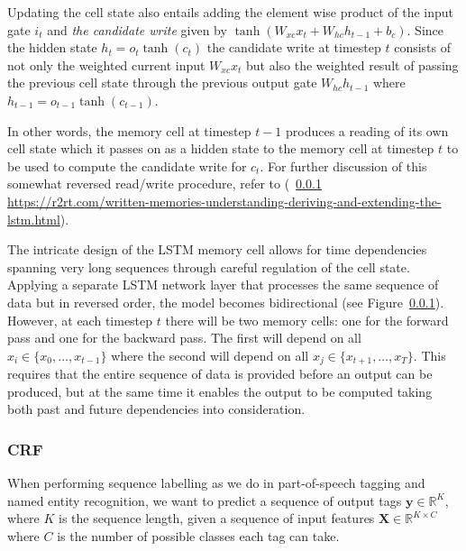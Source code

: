Updating the cell state also entails adding the element wise product of the
input gate $i_{t}$ and \textit{the candidate write} given by $\tanh(W_{xc}x_{t}
+ W_{hc}h_{t-1} + b_{c})$. Since the hidden state $h_{t} = o_{t}\tanh(c_{t})$
the candidate write at timestep $t$ consists of not only the weighted current
input $W_{xc}x_{t}$ but also the weighted result of passing the previous cell
state through the previous output gate $W_{hc}h_{t-1}$ where $h_{t-1} =
o_{t-1}\tanh(c_{t-1})$.

In other words, the memory cell at timestep $t-1$ produces a reading of its own
cell state which it passes on as a hidden state to the memory cell at timestep
$t$ to be used to compute the candidate write for $c_{t}$. For further
discussion of this somewhat reversed read/write procedure, refer to (~\ref{}
\url{https://r2rt.com/written-memories-understanding-deriving-and-extending-the-lstm.html}).

The intricate design of the LSTM memory cell allows for time dependencies
spanning very long sequences through careful regulation of the cell state.
Applying a separate LSTM network layer that processes the same sequence of data
but in reversed order, the model becomes bidirectional (see Figure~\ref{}).
However, at each timestep $t$ there will be two memory cells: one for the
forward pass and one for the backward pass. The first will depend on all $x_{i}
\in \{x_{0}, \ldots, x_{t-1}\}$ where the second will depend on all $x_{j} \in
\{x_{t+1}, \ldots, x_{T}\}$. This requires that the entire sequence of data is
provided before an output can be produced, but at the same time it enables the
output to be computed taking both past and future dependencies into
consideration.






\subsubsection{CRF}

When performing sequence labelling as we do in part-of-speech tagging and named
entity recognition, we want to predict a sequence of output tags $\bm{y} \in
\mathbb{R}^{K}$, where $K$ is the sequence length, given a sequence of input
features $\bm{X} \in \mathbb{R}^{K \times C}$ where $C$ is the number of
possible classes each tag can take.

